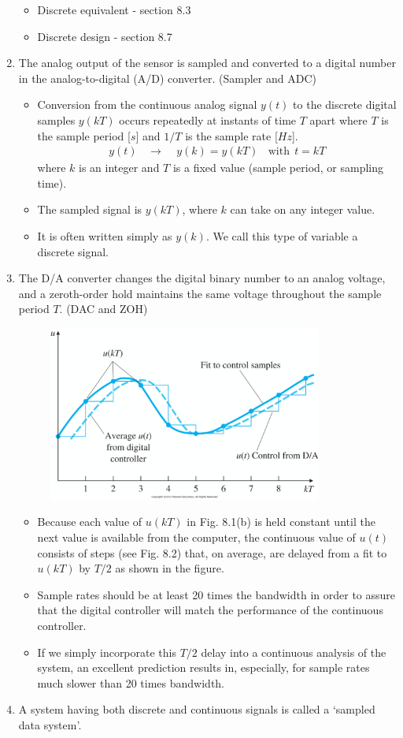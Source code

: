 \documentclass[landscape,14pt]{oblivoir}
\begin{document}
\begin{enumerate}
\begin{itemize}
		\item Discrete equivalent - section 8.3 
		\item Discrete design  - section 8.7 
	\end{itemize}
	\item The analog output of the sensor is sampled and converted to a digital number in the analog-to-digital (A/D) converter. (Sampler and ADC)
	\begin{itemize}
		\item Conversion from the continuous analog signal $y(t)$ to the discrete digital samples $y(kT)$ occurs repeatedly at instants of time $T$ apart where $T$ is the sample period [$s$] and $1/T$ is the sample rate [$Hz$].
		\begin{align*}
			y(t) ~~~~ \rightarrow~~~~~y (k) = y(kT) ~~~~\mbox{with} ~~ t = kT  
		\end{align*}
		where $k$ is an integer and $T$ is a fixed value (sample period, or sampling time). 
		\item The sampled signal is $y(kT)$, where $k$ can take on any integer value. 
		\item It is often written simply as $y(k)$. We call this type of variable a discrete signal. 
	\end{itemize}   
%
\newpage
%
	\item The D/A converter changes the digital binary number to an analog voltage, and a zeroth-order hold maintains the same voltage throughout the sample period $T$. (DAC and ZOH)
	\begin{figure}[h]
		\includegraphics[width=9cm]{./FIG_Franklin/fig8-2.png}
	\end{figure}
	\begin{itemize}
		\item Because each value of $u(kT)$ in Fig. 8.1(b) is held constant until the next value is available from the computer, the continuous value of $u(t)$ consists of steps (see Fig. 8.2) that, on average, are delayed from a fit to $u(kT)$ by $T/2$ as shown in the figure. 
		\item Sample rates should be at least 20 times the bandwidth in order to assure that the digital controller will match the performance of the continuous controller.
		\item If we simply incorporate this $T/2$ delay into a continuous analysis of the system, an excellent prediction results in, especially, for sample rates much slower than 20 times bandwidth.
	\end{itemize}
	\item A system having both discrete and continuous signals is called a `sampled data system'. 
\end{enumerate}
%
%
\newpage
%
\end{document}
